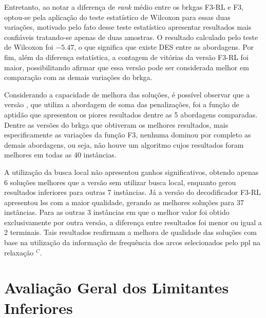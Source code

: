 Entretanto, ao notar a diferença de {\em rank} médio entre os \gls{brkga}s F3-RL
e F3, optou-se  pela aplicação do teste estatístico de  Wilcoxon para essas duas
variações, motivado pelo fato desse teste estatístico apresentar resultados mais
confiáveis tratando-se apenas de duas amostras. O resultado calculado pelo teste
de Wilcoxon foi $-5.47$, o que significa que existe DES entre as abordagens. Por
fim, além da  diferença estatística, a contagem de vitórias  da versão F3-RL foi
maior, possibilitando  afirmar que  essa versão pode  ser considerada  melhor em
comparação com as demais variações do \gls{brkga}.

Considerando a  capacidade de melhora  das soluções,  é possível observar  que a
versão {\bfdois}, que utiliza a abordagem de soma das penalizações, foi a função
de  aptidão  que  apresentou  os   piores  resultados  dentre  as  5  abordagens
comparadas.  Dentre  as  versões  do   \gls{brkga}  que  obtiveram  os  melhores
resultados, mais especificamente as variações  da função F3, nenhuma dominou por
completo as demais abordagens, ou seja,  não houve um algoritmo cujos resultados
foram melhores em todas as 40 instâncias.

A utilização da busca local não apresentou ganhos significativos, obtendo apenas
6 soluções  melhores que a versão  {\bftres} sem utilizar busca  local, enquanto
gerou  resultados  inferiores   para  outras  7  instâncias.  Já   a  versão  do
decodificador  F3-RL apresentou  \gls{ls}s  com a  maior  qualidade, gerando  as
melhores  soluções para  37 instâncias.  Para as  outras 3  instâncias em  que o
melhor  valor foi  obtido exclusivamente  por  outra versão,  a diferença  entre
resultados foi menor ou igual a 2 terminais. Tais resultados reafirmam a melhora
de qualidade das soluções com base na utilização da informação de frequência dos
arcos selecionados pelo \gls{ppl} na relaxação {\rlq}$^C$.



\newpage

\section{Avaliação Geral dos Limitantes Inferiores} \label{sec:resultados-li}

